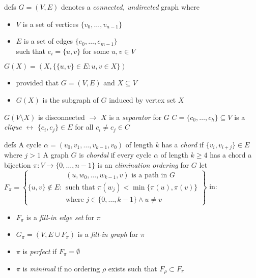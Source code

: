\documentclass{beamer}
\begin{document}
\begin{frame}{defs}
$G = (V, E)$ denotes a \textit{connected, undirected} graph where
\begin{itemize}
    \item $V$ is a set of vertices $\lbrace v_{0}, \ldots, v_{n-1} \rbrace$
    \item $E$ is a set of edges $\lbrace e_{0}, \ldots, e_{m-1} \rbrace$ \\
    such that $e_{i}= \lbrace u, v \rbrace$ for some $u, v\in V$
\end{itemize}
\vfill
$G(X)=\left(X,  \lbrace \lbrace u, v \rbrace \in E: u, v\in X \rbrace\right)$ 
\begin{itemize}
    \item provided that $G=(V, E)$ and $X\subseteq V$
    \item $G(X)$ is the subgraph of $G$ induced by vertex set $X$
\end{itemize}
\vfill
$G(V\setminus X)$ is disconnected $\rightarrow$ $X$ is a \textit{separator} for $G$
\vfill
$C= \lbrace c_{0}, \ldots, c_{h} \rbrace\subseteq V$ is a \textit{clique}
$\leftrightarrow$ $\lbrace c_{i}, c_{j} \rbrace \in E$ for all $c_{i}\neq c_{j}\in C$
\end{frame}

\begin{frame}{defs}
A cycle $\alpha = (v_{0}, v_{1}, \ldots, v_{k-1}, v_{0})$ of length $k$ has a
\textit{chord} if $\lbrace v_{i},v_{i+j} \rbrace\in E$ where $j>1$
\vfill
A graph $G$ is \textit{chordal} if every cycle $\alpha$ of length $k\geq 4$ has
a chord
\vfill
a bijection $\pi: V \rightarrow  \lbrace 0, \ldots, n-1 \rbrace$  is an
\textit{elimination ordering} for $G$
\vfill
let $F_{\pi} = \left\lbrace \lbrace u, v \rbrace \not\in E:
        \begin{array}{l}
            (u, w_{0}, \ldots, w_{k-1}, v) \text{ is a path in } G\\ 
            \text{such that } \pi(w_{j})< \min{ \lbrace \pi(u), \pi(v) \rbrace}\\
            \text{where } j\in  \lbrace 0, \ldots, k-1 \rbrace \wedge u\neq v
        \end{array}
        \right\rbrace$ in:
\begin{itemize}
    \item $F_{\pi}$ is a \textit{fill-in edge set} for $\pi$
    \item $G_{\pi}=(V, E\cup F_{\pi})$ is a \textit{fill-in graph} for $\pi$ 
    \item $\pi$ is \textit{perfect} if $F_{\pi}=\emptyset$
    \item $\pi$ is \textit{minimal} if no ordering $\rho$ exists such that
    $F_{\rho}\subset F_{\pi}$
\end{itemize}
\end{frame}
\end{document}
